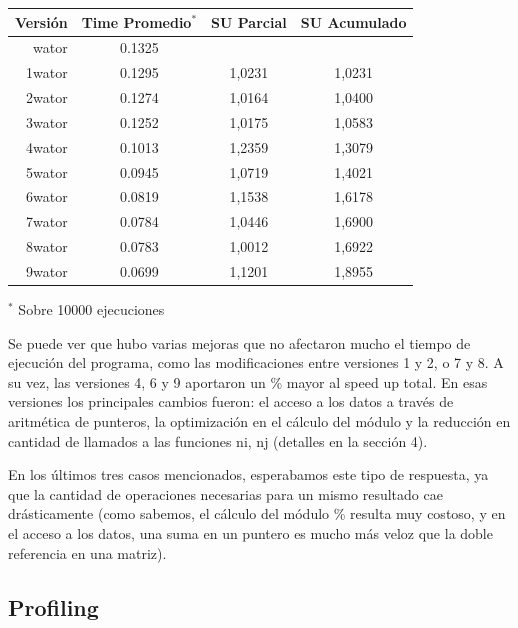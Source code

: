 \documentclass[a4paper,10pt]{article}
\begin{document}
\begin{center}
  \begin{tabular}{| r | c | c | c |}
    \hline
    Versi\'on	&   Time Promedio$^*$  &	SU Parcial	& 	SU Acumulado	\\ \hline \hline
    wator	&	0.1325		&       		&			\\ \hline
    1wator	&	0.1295		&   	1,0231		&	1,0231		\\ \hline
    2wator	&	0.1274		&	1,0164		&	1,0400		\\ \hline
    3wator	&	0.1252		&	1,0175		&	1,0583		\\ \hline
    4wator	&	0.1013		&	1,2359		&	1,3079		\\ \hline
    5wator	&	0.0945		&	1,0719		&	1,4021		\\ \hline
    6wator	&	0.0819		&	1,1538		&	1,6178		\\ \hline
    7wator	&	0.0784		&	1,0446		&	1,6900		\\ \hline
    8wator	&	0.0783		&	1,0012		&	1,6922		\\ \hline
    9wator	&	0.0699		&	1,1201		&	1,8955		\\ \hline

  \end{tabular}
	
	\small{$^*$ Sobre 10000 ejecuciones}
	\end{center}

\bigskip

    Se puede ver que hubo varias mejoras que no afectaron mucho el tiempo de ejecuci\'on del programa, como las modificaciones entre versiones 1 y 2, o 7 y 8. A su vez, las versiones 4, 6 y 9 aportaron un \% mayor al speed up total. En esas versiones los principales cambios fueron: el acceso a los datos a trav\'es de aritm\'etica de punteros, la optimizaci\'on en el c\'alculo del m\'odulo y la reducci\'on en cantidad de llamados a las funciones ni, nj (detalles en la secci\'on 4).
    
    En los \'ultimos tres casos mencionados, esperabamos este tipo de respuesta, ya que la cantidad de operaciones necesarias para un mismo resultado cae dr\'asticamente (como sabemos, el c\'alculo del m\'odulo \% resulta muy costoso, y en el acceso a los datos, una suma en un puntero es mucho m\'as veloz que la doble referencia en una matriz).  

\subsection{Profiling}
\end{document}
